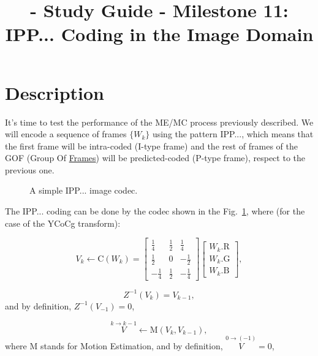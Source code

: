 
\title{\SM{} - Study Guide - Milestone 11: IPP... Coding in the Image Domain}

\maketitle

\tableofcontents

\section{Description}

It's time to test the performance of the ME/MC process previously
described. We will encode a sequence of frames $\{W_k\}$ using the
pattern IPP..., which means that the first frame will be intra-coded
(I-type frame) and the rest of frames of the GOF (Group Of
\href{https://en.wikipedia.org/wiki/Group_of_pictures}{Frames}) will
be predicted-coded (P-type frame), respect to the previous one.

\begin{figure}
  \centering
  \caption{A simple IPP... image codec.}
\label{fig:IPP_codec}
\end{figure}

The IPP... coding can be done by the codec shown in the
Fig.~\ref{fig:IPP_codec}, where (for the case of the YCoCg transform):

\begin{equation}
  V_k \leftarrow \text{C}(W_k) =
  \begin{bmatrix}
    \frac{1}{4} &  \frac{1}{2}  &  \frac{1}{4} \\ 
    \frac{1}{2} &            0  & -\frac{1}{2} \\
    -\frac{1}{4} &  \frac{1}{2}  & -\frac{1}{4}
  \end{bmatrix}
  \begin{bmatrix}
    W_k.\text{R} \\
    W_k.\text{G} \\
    W_k.\text{B}
  \end{bmatrix}
  , \tag{a}
\end{equation}

\begin{equation}
  Z^{-1}(V_k) = V_{k-1},
  \tag{b}
\end{equation}
and by definition, $Z^{-1}(V_{-1}) = 0$,

\begin{equation}
  \overset{k\rightarrow k-1}{V} \leftarrow \text{M}(V_k, V_{k-1}),
  \tag{c}
\end{equation}
where M stands for Motion Estimation, and by definition,
$\overset{0\rightarrow (-1)}{V}=0$,

